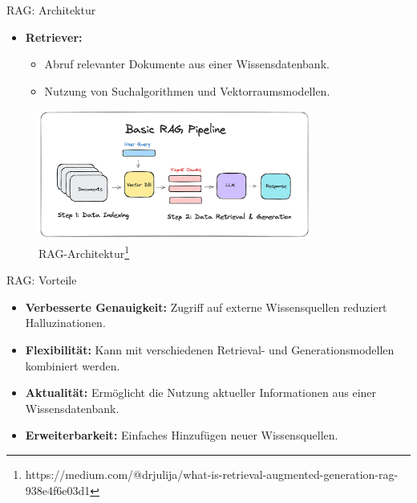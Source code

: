 \documentclass[aspectratio=1610, xcolor=dvipsnames, 9pt]{beamer}
\begin{document}
\begin{frame}{RAG: Architektur}
  \begin{itemize}
    \item \textbf{Retriever:}
      \begin{itemize}
        \item Abruf relevanter Dokumente aus einer Wissensdatenbank.
        \item Nutzung von Suchalgorithmen und Vektorraumsmodellen.
      \end{itemize}

  \end{itemize}
  \begin{figure}
    \centering
    \includegraphics[width=0.8\textwidth]{images/basicrag.png}
    \caption{RAG-Architektur\footnote{https://medium.com/@drjulija/what-is-retrieval-augmented-generation-rag-938e4f6e03d1}}
  \end{figure}
\end{frame}

\begin{frame}{RAG: Vorteile}
  \begin{itemize}
    \item \textbf{Verbesserte Genauigkeit:} Zugriff auf externe Wissensquellen reduziert Halluzinationen. \\
    \item \textbf{Flexibilität:} Kann mit verschiedenen Retrieval- und Generationsmodellen kombiniert werden. \\
    \item \textbf{Aktualität:} Ermöglicht die Nutzung aktueller Informationen aus einer Wissensdatenbank. \\
    \item \textbf{Erweiterbarkeit:} Einfaches Hinzufügen neuer Wissensquellen.
  \end{itemize}
\end{frame}
\end{document}
